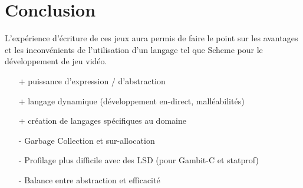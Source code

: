 \documentclass[12pt,oneside,letterpaper,francais]{book}
\begin{document}

\chapter{Conclusion}


L'expérience d'écriture de ces jeux aura permis de faire le point sur
les avantages et les inconvénients de l'utilisation d'un langage tel
que Scheme pour le développement de jeu vidéo.


\begin{itemize}
  \item[+] puissance d'expression / d'abstraction
  \item[+] langage dynamique (développement en-direct, malléabilités)
  \item[+] création de langages spécifiques au domaine

  \item[-] Garbage Collection et sur-allocation
  \item[-] Profilage plus difficile avec des LSD (pour Gambit-C et statprof)
  \item[-] Balance entre abstraction et efficacité
\end{itemize}





\appendix



\end{document}

